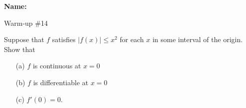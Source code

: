 \documentclass[12pt]{article}
\begin{document}
\noindent \textbf{Name:} 

\begin{center}
Warm-up \#14
\end{center}

\noindent Suppose that $f$ satisfies $|f(x)| \leqslant x^2$ for each $x$ in some interval of the origin. Show that 
\begin{enumerate}
\item[(a)] $f$ is continuous at $x = 0$
\item[(b)] $f$ is differentiable at $x = 0$
\item[(c)] $f'(0) = 0$.
\end{enumerate}
\end{document}
